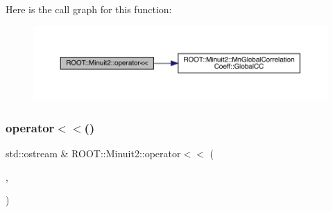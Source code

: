 Here is the call graph for this function\+:
\nopagebreak
\begin{figure}[H]
\begin{center}
\leavevmode
\includegraphics[width=350pt]{d6/d3a/namespaceROOT_1_1Minuit2_ad8fa7aff1b1b2645f8b2a9c9a2231252_cgraph}
\end{center}
\end{figure}
\mbox{\label{namespaceROOT_1_1Minuit2_a30dd5b9978bba19603bb3fb0f7427ddc}} 
\subsubsection{\texorpdfstring{operator$<$$<$()}{operator<<()}\hspace{0.1cm}{\footnotesize\ttfamily [8/11]}}
{\footnotesize\ttfamily std\+::ostream \& R\+O\+O\+T\+::\+Minuit2\+::operator$<$$<$ (\begin{DoxyParamCaption}\item[{std\+::ostream \&}]{,  }\item[{const \mbox{\hyperlink{classROOT_1_1Minuit2_1_1MnUserParameterState}{Mn\+User\+Parameter\+State}} \&}]{ }\end{DoxyParamCaption})}

